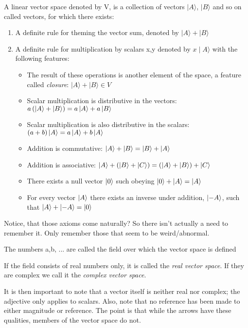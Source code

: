 \begin{defi}
A linear vector space denoted by V, is a collection of vectors $\mid A \rangle$, $\mid B \rangle$ and so on called vectors, for which there exists:
\begin{enumerate}
\item A definite rule for theming the vector sum, denoted by $\mid A \rangle + \mid B \rangle$
\item A definite rule for multiplication by scalars x,y denoted by $x \mid A \rangle$ with the following features:
\begin{itemize}
\item The result of these operations is another element of the space, a feature called \textit{closure}: $\mid A \rangle + \mid B \rangle \in V$
\item Scalar multiplication is distributive in the vectors: $a\left(\left| A \right>+\left| B \right> \right) = a\left| A \right> + a\left| B \right>$
\item Scalar multiplication is also distributive in the scalars: $\left(a+b \right)\left| A \right> = a\left| A \right> + b\left| A \right>$
\item Addition is commutative: $\left| A \right> + \left| B \right> = \left| B \right> + \left| A \right>$
\item Addition is associative: $\left| A \right> + \left(\left| B \right> + \left| C \right> \right) = \left(\left| A \right> + \left| B \right> \right) + \left| C \right>$
\item There exists a null vector $\left| 0 \right>$ such obeying $\left| 0 \right> + \left| A \right> = \left| A \right>$
\item For every vector $\left| A \right>$ there exists an inverse under addition, $\left| -A \right>$, such that $\left| A \right> + \left| -A \right> = \left| 0 \right>$
\end{itemize}
\end{enumerate} 
\end{defi}

Notice, that those axioms come naturally? So there isn't actually a need to remember it. Only remember those that seem to be weird/abnormal.

\begin{defi}[Field]
The numbers a,b, ... are called the field over which the vector space is defined
\end{defi}

If the field consists of real numbers only, it is called the \textit{real vector space}. If they are complex we call it the \textit{complex vector space}.

It is then important to note that a vector itself is neither real nor complex; the adjective only applies to scalars. Also, note that no reference has been made to either magnitude or reference. The point is that while the arrows have these qualities, members of the vector space do not. 

